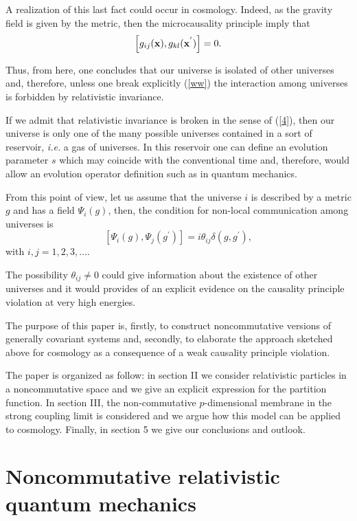 \documentclass[a4paper,aps,twocolumn,amsfonts]{revtex4}
\begin{document}
A realization of this last fact could occur in cosmology. Indeed, as the gravity field is given by the metric, then the microcausality principle imply that
\begin{equation}
\left[ g_{ij}({\bf x}), g_{kl}({\bf x}^{'})\right] = 0. \label{ww}
\end{equation}

Thus, from here, one concludes that our universe is isolated of other universes and, therefore, unless one break explicitly (\ref{ww}) the interaction among universes is forbidden by relativistic  invariance.

If we admit that relativistic invariance is broken in the sense of (\ref{4}), then our universe is only one of the many possible universes contained in a sort of reservoir, {\it i.e.} a gas of universes. In this reservoir one can define an evolution  parameter $s$ which may coincide with the conventional time and, therefore, would allow  an evolution operator definition such as in quantum mechanics.

   From this point of view, let us assume that the universe $i$ is described by a metric $g$ and has a field  $\Psi_i(g)$, then, the condition for non-local communication  among universes is
   \begin{equation}
   \left[ \Psi_i (g), \Psi_j (g^{'}) \right] = i \theta_{ij} \delta (g,g^{'}),
   \label{5}
   \end{equation}
   with $i,j= 1, 2, 3, \dots$.

   The possibility $\theta_{ij}\neq 0$ could give information about the existence of other universes  and it would provides of an explicit evidence on the causality principle violation at very high energies.

   The purpose of this paper is, firstly,  to construct noncommutative versions of generally covariant systems and, secondly, to elaborate the approach sketched above for cosmology as a consequence of a weak causality principle violation.

   The paper is organized as follow: in section II we consider relativistic particles  in a noncommutative space and we give an explicit expression for the partition function. In section III, the non-commutative $p$-dimensional membrane in the strong coupling limit is considered and we argue how this model can be applied to cosmology. Finally, in section 5 we give our conclusions and outlook.

   \section{Noncommutative relativistic quantum mechanics}
\end{document}
